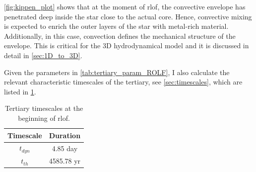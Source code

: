 \cref{fig:kippen_plot} shows that at the moment of \ac{rlof}, the convective envelope has penetrated deep inside the star close to the actual core. Hence, convective mixing is expected to enrich the outer layers of the star with metal-rich material. Additionally, in this case, convection defines the mechanical structure of the envelope. This is critical for the 3D hydrodynamical model and it is discussed in detail in \cref{sec:1D_to_3D}. 

Given the parameters in \cref{tab:tertiary_param_ROLF}, I also calculate the relevant characteristic timescales of the tertiary, see \cref{sec:timescales}, which are listed in \cref{tab:tertiary_timescale_ROLF}.
\begin{table}[H]
    \centering
    \begin{tabular}{| c | c |}
       Timescale & Duration \\
       \hline
       $t_{dyn}$ & 4.85 day\\
       $t_{th}$ & 4585.78 yr 
    \end{tabular}
    \caption{ Tertiary timescales at the beginning of \ac{rlof}.}
    \label{tab:tertiary_timescale_ROLF}
\end{table}

